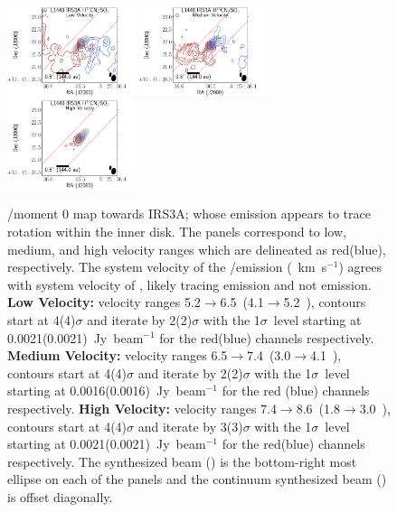 \begin{figure}[H]
\begin{center}
   \includegraphics[width=0.33\textwidth]{img/L1448IRS3B_H13CN_image_taper1000k__-irs3alow_irs3a.pdf}
   \includegraphics[width=0.33\textwidth]{img/L1448IRS3B_H13CN_image_taper1000k__-irs3amed_irs3a.pdf}
   \includegraphics[width=0.33\textwidth]{img/L1448IRS3B_H13CN_image_taper1000k__-irs3ahigh_irs3a.pdf} %
\end{center}
   \caption{\htcn/\sot\space moment 0 map towards IRS3A; whose emission appears to trace rotation within the inner disk. The panels correspond to low, medium, and high velocity ranges which are delineated as red(blue), respectively. The system velocity of the \htcn/\sot\space emission (~km~s$^{-1}$) agrees with system velocity of \cso\space, likely tracing \htcn\space emission and not \sot\space emission. \textbf{Low Velocity:} velocity ranges 5.2$\rightarrow$6.5~\kms (4.1$\rightarrow$5.2~\kms), contours start at 4(4)$\sigma$ and iterate by 2(2)$\sigma$ with the 1$\sigma$~level starting at 0.0021(0.0021)~Jy~beam$^{-1}$ for the red(blue) channels respectively. \textbf{Medium Velocity:}  velocity ranges 6.5$\rightarrow$7.4~\kms (3.0$\rightarrow$4.1~\kms), contours start at 4(4)$\sigma$ and iterate by 2(2)$\sigma$ with the 1$\sigma$~level starting at 0.0016(0.0016)~Jy~beam$^{-1}$ for the red (blue) channels respectively. \textbf{High Velocity:} velocity ranges 7.4$\rightarrow$8.6~\kms (1.8$\rightarrow$3.0~\kms), contours start at 4(4)$\sigma$ and iterate by 3(3)$\sigma$ with the 1$\sigma$~level starting at 0.0021(0.0021)~Jy~beam$^{-1}$ for the red(blue) channels respectively. The \htcn\space synthesized beam (\htcnbeam) is the bottom-right most ellipse on each of the panels and the continuum synthesized beam (\contbeam) is offset diagonally.}\label{fig:irs3ah13cnmoment}
\end{figure}


